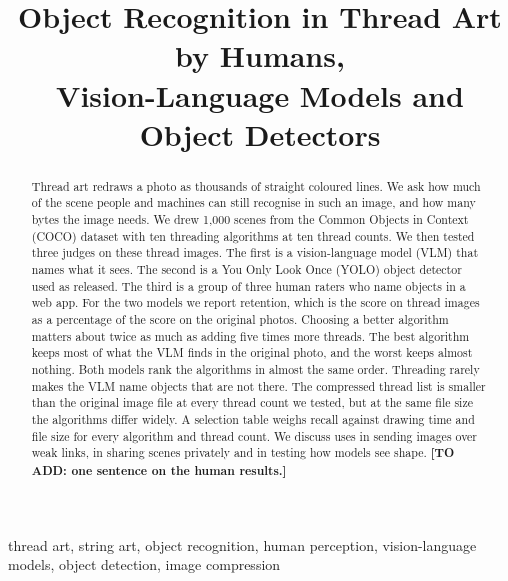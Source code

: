\documentclass[conference]{IEEEtran}
\newcommand{\todo}[1]{\textbf{[TO ADD: #1]}}
\begin{document}
\title{Object Recognition in Thread Art by Humans,\\ Vision-Language Models and Object Detectors}

\author{
}

\maketitle

\begin{abstract}
Thread art redraws a photo as thousands of straight coloured lines. We ask how much of the scene people and machines can still recognise in such an image, and how many bytes the image needs. We drew 1,000 scenes from the Common Objects in Context (COCO) dataset with ten threading algorithms at ten thread counts. We then tested three judges on these thread images. The first is a vision-language model (VLM) that names what it sees. The second is a You Only Look Once (YOLO) object detector used as released. The third is a group of three human raters who name objects in a web app. For the two models we report retention, which is the score on thread images as a percentage of the score on the original photos. Choosing a better algorithm matters about twice as much as adding five times more threads. The best algorithm keeps most of what the VLM finds in the original photo, and the worst keeps almost nothing. Both models rank the algorithms in almost the same order. Threading rarely makes the VLM name objects that are not there. The compressed thread list is smaller than the original image file at every thread count we tested, but at the same file size the algorithms differ widely. A selection table weighs recall against drawing time and file size for every algorithm and thread count. We discuss uses in sending images over weak links, in sharing scenes privately and in testing how models see shape. \todo{one sentence on the human results.}
\end{abstract}

\begin{IEEEkeywords}
thread art, string art, object recognition, human perception, vision-language models, object detection, image compression
\end{IEEEkeywords}
\end{document}
